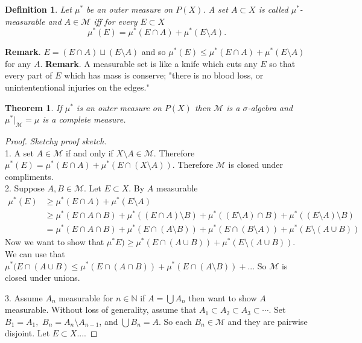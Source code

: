 \documentclass[letter]{article}
\newtheorem{theorem}{Theorem}
\newtheorem{definition}{Definition}
\def\scriptm{{\mathcal M}}
\begin{document}
\begin{definition}
	Let $\mu^*$ be an outer measure on $P(X)$. A set $A \subset X$ is called $\mu^*$-measurable and $A \in \scriptm$
	iff for every $E \subset X$
	\begin{equation*}
		\mu^*(E) = \mu^*(E \cap A) + \mu^*(E \setminus A).
	\end{equation*}
\end{definition}
\textbf{Remark}. $E = (E \cap A) \sqcup (E \setminus A)$ and so $
		\mu^*(E) \leq \mu^*(E \cap A) + \mu^*(E \setminus A)$ for any $A$.
\noindent \textbf{Remark}. A measurable set is like a knife which cuts any $E$ so that every part of $E$ which has mass is conserve; "there is no blood loss, or unintententional injuries on the edges."
\begin{theorem}
	If $\mu^*$ is an outer measure on $P(X)$ then $\scriptm$ is a $\sigma$-algebra and $\mu^*|_\scriptm = \mu$ is a complete measure.
\end{theorem}

\begin{proof} \emph{Sketchy proof sketch.} \\
	1. A set $A \in \scriptm$ if and only if $X \setminus A \in \scriptm$. Therefore $\mu^*(E) = \mu^*(E \cap A) + \mu^*(E \cap (X \setminus A))$. Therefore $\scriptm$ is closed under compliments.\\

	2. Suppose $A, B \in \scriptm$. Let $E \subset X.$ By $A$ measurable
	\begin{equation*}
		\begin{aligned}
			\mu^*(E) &\geq \mu^*(E \cap A) + \mu^*(E \setminus A) \\
			&\geq \mu^*(E \cap A \cap B) + \mu^*((E \cap A) \setminus B) + \mu^*((E \setminus A) \cap B) + \mu^*((E \setminus A) \setminus B) \\
			&=\mu^*(E \cap A \cap B) + \mu^*(E \cap (A \setminus B)) + \mu^*(E \cap (B \setminus A)) + \mu^*(E \setminus (A \cup B))
		\end{aligned}
	\end{equation*}
	Now we want to show that $\mu^*E) \geq \mu^*(E \cap (A \cup B)) + \mu^*(E \setminus (A \cup B))$. We can use that $\mu^*(E \cap (A \cup B) \leq \mu^*(E \cap ( A \cap B)) + \mu^*(E \cap ( A \setminus B)) + ...$ So $\scriptm$ is closed under unions.

	3. Assume $A_n$ measurable for $n \in \mathbb{N}$ if $A = \bigcup A_n$ then want to show $A$ measurable. Without loss of generality, assume that $A_1 \subset A_2 \subset A_3 \subset \cdots$. Set $B_1 = A_1,$ $B_n = A_n \setminus A_{n-1}$, and $\bigcup B_n = A$. So each $B_n \in \scriptm$ and they are pairwise disjoint. Let $E \subset X$....
\end{proof}


\end{document}
